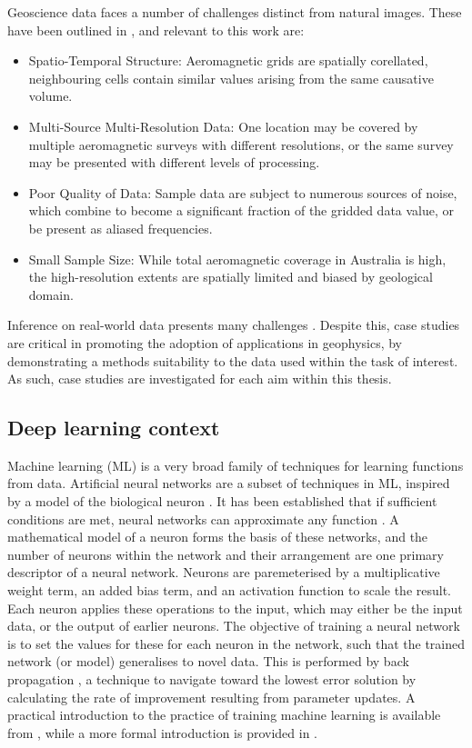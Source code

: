 Geoscience data faces a number of challenges distinct from natural images. These have been outlined in \textcite{karpatneMachineLearningGeosciences2019}, and relevant to this work are:
\begin{itemize}
    \item{} Spatio-Temporal Structure: Aeromagnetic grids are spatially corellated, neighbouring cells contain similar values arising from the same causative volume.
    \item{} Multi-Source Multi-Resolution Data: One location may be covered by multiple aeromagnetic surveys with different resolutions, or the same survey may be presented with different levels of processing.
    \item{} Poor Quality of Data: Sample data are subject to numerous sources of noise, which combine to become a significant fraction of the gridded data value, or be present as aliased frequencies.
    \item{} Small Sample Size: While total aeromagnetic coverage in Australia is high, the high-resolution extents are spatially limited and biased by geological domain.
\end{itemize}

Inference on real-world data presents many challenges \parencite{nikolenkoSyntheticDataDeep2021,tremblayTrainingDeepNetworks2018}.
Despite this, case studies are critical in promoting the adoption of applications in geophysics, by demonstrating a methods suitability to the data used within the task of interest.
As such, case studies are investigated for each aim within this thesis.

\subsection{Deep learning context}
Machine learning (ML) is a very broad family of techniques for learning functions from data.
Artificial neural networks are a subset of techniques in ML, inspired by a model of the biological neuron \parencite{bishopNeuralNetworksPattern1995}.
It has been established that if sufficient conditions are met, neural networks can approximate any function \parencite{hornikMultilayerFeedforwardNetworks1989}.
A mathematical model of a neuron forms the basis of these networks, and the number of neurons within the network and their arrangement are one primary descriptor of a neural network.
Neurons are paremeterised by a multiplicative weight term, an added bias term, and an activation function to scale the result.
Each neuron applies these operations to the input, which may either be the input data, or the output of earlier neurons.
The objective of training a neural network is to set the values for these for each neuron in the network, such that the trained network (or model) generalises to novel data.
This is performed by back propagation \parencite{rumelhartLearningRepresentationsBackpropagating1988}, a technique to navigate toward the lowest error solution by calculating the rate of improvement resulting from parameter updates.
A practical introduction to the practice of training machine learning is available from \textcite{stevensDeepLearningPyTorch2020}, while a more formal introduction is provided in \textcite{bishopPatternRecognitionMachine2006}.

